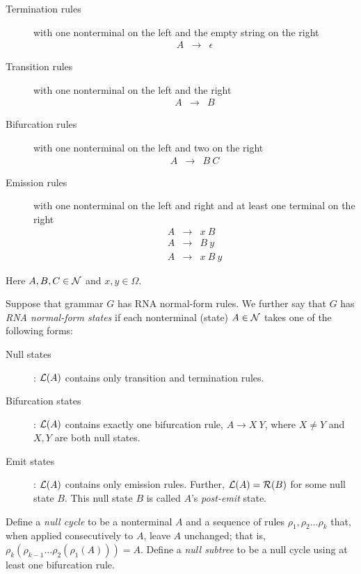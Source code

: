 \documentclass[10pt]{article}
\begin{document}
\noindent \hrulefill
\begin{description}
\item[Termination rules] with one nonterminal on the left and the empty string on the right
\begin{eqnarray*}
A & \to & \epsilon
\end{eqnarray*}
\item[Transition rules] with one nonterminal on the left and the right
\begin{eqnarray*}
A & \to & B
\end{eqnarray*}
\item[Bifurcation rules] with one nonterminal on the left and two on the right
\begin{eqnarray*}
A & \to & B\ C
\end{eqnarray*}
\item[Emission rules] with one nonterminal on the left and right and at least one terminal on the right
\begin{eqnarray*}
A & \to & x\ B \\
A & \to & B\ y \\
A & \to & x\ B\ y
\end{eqnarray*}
\end{description}
\noindent \hrulefill

\noindent
Here $A,B,C \in {\cal N}$ and $x,y \in \Omega$.

Suppose that grammar $G$ has RNA normal-form rules.
We further say that $G$ has {\em RNA normal-form states} if
each nonterminal (state) $A \in {\cal N}$ takes one of the following forms:

\noindent \hrulefill
\begin{description}
\item[Null states]: ${\cal L}(A)$ contains only transition and termination rules.
\item[Bifurcation states]: ${\cal L}(A)$ contains exactly one bifurcation rule, $A \to X\ Y$, where $X \neq Y$ and $X,Y$ are both null states.
\item[Emit states]: ${\cal L}(A)$ contains only emission rules. Further, ${\cal L}(A) = {\cal R}(B)$ for some null state $B$.
This null state $B$ is called $A$'s {\em post-emit} state.
\end{description}
\noindent \hrulefill

Define a {\em null cycle} to be a nonterminal $A$
and a sequence of rules $\rho_1, \rho_2 \ldots \rho_k$ that, when applied consecutively to $A$, leave $A$ unchanged;
that is, $\rho_k(\rho_{k-1} \ldots \rho_2(\rho_1(A))) = A$.
Define a {\em null subtree} to be a null cycle using at least one bifurcation rule.
\end{document}
